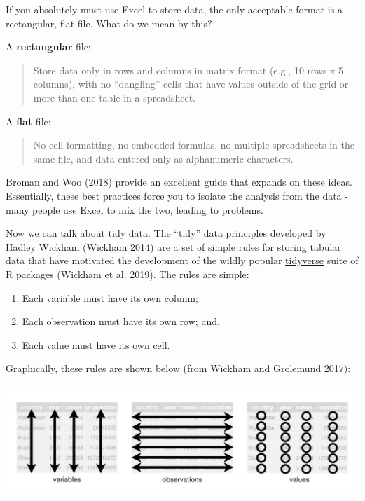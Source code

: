 \documentclass[
  letterpaper,
  DIV=11,
  numbers=noendperiod]{scrreprt}
\providecommand{\tightlist}{%
  \setlength{\itemsep}{0pt}\setlength{\parskip}{0pt}}\usepackage{longtable,booktabs,array}
\begin{document}
If you absolutely must use Excel to store data, the only acceptable
format is a rectangular, flat file. What do we mean by this?

A \textbf{rectangular} file:

\begin{quote}
Store data only in rows and columns in matrix format (e.g., 10 rows x 5
columns), with no ``dangling'' cells that have values outside of the
grid or more than one table in a spreadsheet.
\end{quote}

A \textbf{flat} file:

\begin{quote}
No cell formatting, no embedded formulas, no multiple spreadsheets in
the same file, and data entered only as alphanumeric characters.
\end{quote}

Broman and Woo (2018) provide an excellent guide that expands on these
ideas. Essentially, these best practices force you to isolate the
analysis from the data - many people use Excel to mix the two, leading
to problems.

Now we can talk about tidy data. The ``tidy'' data principles developed
by Hadley Wickham (Wickham 2014) are a set of simple rules for storing
tabular data that have motivated the development of the wildly popular
\href{https://www.tidyverse.org/}{tidyverse} suite of R packages
(Wickham et al. 2019). The rules are simple:

\begin{enumerate}
\def\labelenumi{\arabic{enumi}.}
\tightlist
\item
  Each variable must have its own column;
\item
  Each observation must have its own row; and,
\item
  Each value must have its own cell.
\end{enumerate}

Graphically, these rules are shown below (from Wickham and Grolemund
2017):

\includegraphics[width=6.4in,height=\textheight]{./img/tidy-1.png}
\end{document}

